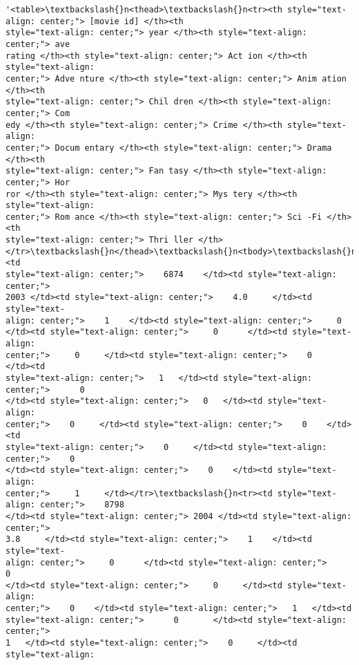 \documentclass[11pt]{article}
\makeatletter
\newcommand{\boxspacing}{\kern\kvtcb@left@rule\kern\kvtcb@boxsep}
\newcommand{\prompt}[4]{
        \ttfamily\llap{{\color{#2}[#3]:\hspace{3pt}#4}}\vspace{-\baselineskip}
    }
\makeatother
\begin{document}
            \begin{tcolorbox}[breakable, size=fbox, boxrule=.5pt, pad at break*=1mm, opacityfill=0]
\prompt{Out}{outcolor}{6}{\boxspacing}
\begin{Verbatim}[commandchars=\\\{\}]
'<table>\textbackslash{}n<thead>\textbackslash{}n<tr><th style="text-align: center;"> [movie id] </th><th
style="text-align: center;"> year </th><th style="text-align: center;"> ave
rating </th><th style="text-align: center;"> Act ion </th><th style="text-align:
center;"> Adve nture </th><th style="text-align: center;"> Anim ation </th><th
style="text-align: center;"> Chil dren </th><th style="text-align: center;"> Com
edy </th><th style="text-align: center;"> Crime </th><th style="text-align:
center;"> Docum entary </th><th style="text-align: center;"> Drama </th><th
style="text-align: center;"> Fan tasy </th><th style="text-align: center;"> Hor
ror </th><th style="text-align: center;"> Mys tery </th><th style="text-align:
center;"> Rom ance </th><th style="text-align: center;"> Sci -Fi </th><th
style="text-align: center;"> Thri ller </th></tr>\textbackslash{}n</thead>\textbackslash{}n<tbody>\textbackslash{}n<tr><td
style="text-align: center;">    6874    </td><td style="text-align: center;">
2003 </td><td style="text-align: center;">    4.0     </td><td style="text-
align: center;">    1    </td><td style="text-align: center;">     0
</td><td style="text-align: center;">     0      </td><td style="text-align:
center;">     0     </td><td style="text-align: center;">    0    </td><td
style="text-align: center;">   1   </td><td style="text-align: center;">      0
</td><td style="text-align: center;">   0   </td><td style="text-align:
center;">    0     </td><td style="text-align: center;">    0    </td><td
style="text-align: center;">    0     </td><td style="text-align: center;">    0
</td><td style="text-align: center;">    0    </td><td style="text-align:
center;">     1     </td></tr>\textbackslash{}n<tr><td style="text-align: center;">    8798
</td><td style="text-align: center;"> 2004 </td><td style="text-align: center;">
3.8     </td><td style="text-align: center;">    1    </td><td style="text-
align: center;">     0      </td><td style="text-align: center;">     0
</td><td style="text-align: center;">     0     </td><td style="text-align:
center;">    0    </td><td style="text-align: center;">   1   </td><td
style="text-align: center;">      0       </td><td style="text-align: center;">
1   </td><td style="text-align: center;">    0     </td><td style="text-align:

\end{Verbatim}
\end{tcolorbox}
\end{document}
